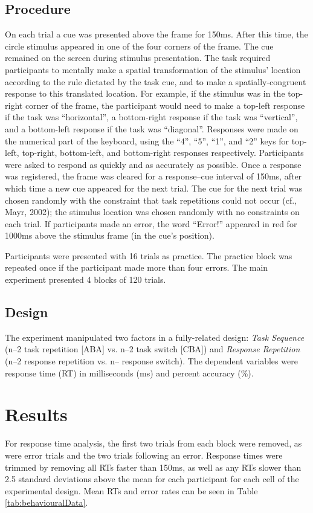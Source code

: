 \documentclass[a4paper, man, natbib]{apa6}
\begin{document}
\subsection{Procedure}
On each trial a cue was presented above the frame for 150ms. After this time, the circle stimulus appeared in one of the four corners of the frame. The cue remained on the screen during stimulus presentation. The task required participants to mentally make a spatial transformation of the stimulus' location according to the rule dictated by the task cue, and to make a spatially-congruent response to this translated location. For example, if the stimulus was in the top-right corner of the frame, the participant would need to make a top-left response if the task was ``horizontal'', a bottom-right response if the task was ``vertical'', and a bottom-left response if the task was ``diagonal''. Responses were made on the numerical part of the keyboard, using the ``4'', ``5'', ``1'', and ``2'' keys for top-left, top-right, bottom-left, and bottom-right responses respectively. Participants were asked to respond as quickly and as accurately as possible. Once a response was registered, the frame was cleared for a response--cue interval of 150ms, after which time a new cue appeared for the next trial. The cue for the next trial was chosen randomly with the constraint that task repetitions could not occur (cf., Mayr, 2002); the stimulus location was chosen randomly with no constraints on each trial. If participants made an error, the word ``Error!'' appeared in red for 1000ms above the stimulus frame (in the cue's position).

Participants were presented with 16 trials as practice. The practice block was repeated once if the participant made more than four errors. The main experiment presented 4 blocks of 120 trials. 

\subsection{Design}
The experiment manipulated two factors in a fully-related design: \emph{Task Sequence} (n--2 task repetition [ABA] vs. n--2 task switch [CBA]) and \emph{Response Repetition} (n--2 response repetition vs. n-- response switch). The dependent variables were response time (RT) in milliseconds (ms) and percent accuracy (\%).


\section{Results}
For response time analysis, the first two trials from each block were removed, as were error trials and the two trials following an error. Response times were trimmed by removing all RTs faster than 150ms, as well as any RTs slower than 2.5 standard deviations above the mean for each participant for each cell of the experimental design. Mean RTs and error rates can be seen in Table \ref{tab:behaviouralData}.
\end{document}
